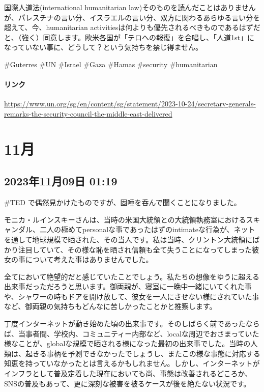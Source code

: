 国際人道法(international humanitarian law)そのものを読んだことはありませんが、パレスチナの言い分、イスラエルの言い分、双方に関わるあらゆる言い分を超えて、今、humanitarian activitiesは何よりも優先されるべきものであるはずだと、（強く）同意します。欧米各国が「テロへの報復」を合唱し、「人道1st」になっていない事に、どうして？という気持ちを禁じ得ません。

\#Guterres \#UN \#Israel \#Gaza \#Hamas \#security \#humanitarian

\paragraph{リンク}
\url{https://www.un.org/sg/en/content/sg/statement/2023-10-24/secretary-generals-remarks-the-security-council-the-middle-east-delivered}

\section{11月}

\subsection*{2023年11月09日 01:19}

\#TED で偶然見かけたものですが、固唾を呑んで聞くことになりました。

モニカ・ルインスキーさんは、当時の米国大統領との大統領執務室におけるスキャンダル、二人の極めてpersonalな事であったはずのintimateな行為が、ネットを通して地球規模で晒された、その当人です。私は当時、クリントン大統領にばかり注目していて、その様な恥を晒され信頼も全て失うことになってしまった彼女の事について考えた事はありませんでした。

全てにおいて絶望的だと感じていたことでしょう。私たちの想像をゆうに超える出来事だっただろうと思います。御両親が、寝室に一晩中一緒にいてくれた事や、シャワーの時もドアを開け放して、彼女を一人にさせない様にされていた事など、御両親の気持ちもどんなに苦しかったことかと推察します。

丁度インターネットが動き始めた頃の出来事です。そのしばらく前であったならば、当事者間、学校内、コミュニティー内部など、localな周辺でおさまっていた様なことが、globalな規模で晒される様になった最初の出来事でした。当時の人類は、起きる事柄を予測できなかったでしょうし、またこの様な事態に対応する知恵を持っていなかったとは言えるかもしれません。しかし、インターネットがインフラとして普及定着した現在においても尚、事態は改善されるどころか、SNSの普及もあって、更に深刻な被害を被るケースが後を絶たない状況です。

